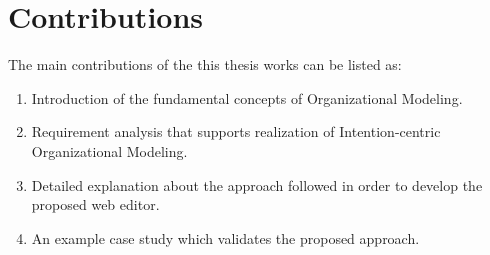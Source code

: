 \section{Contributions}
\label{sec:contributions}
The main contributions of the this thesis works can be listed as:

\begin{enumerate}
	\item Introduction of the fundamental concepts of Organizational Modeling.
	\item Requirement analysis that supports realization of Intention-centric Organizational Modeling.
	\item Detailed explanation about the approach followed in order to develop the proposed web editor.
	\item An example case study which validates the proposed approach.
\end{enumerate}


